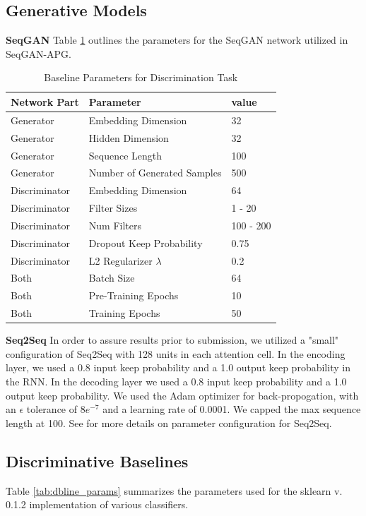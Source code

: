 \documentclass[sigconf]{acmart}
\begin{document}
\subsection{Generative Models}

\textbf{SeqGAN}
Table \ref{tab:seqgan_params} outlines the parameters for the SeqGAN network utilized in SeqGAN-APG. 
\begin{table}[ht]
	\begin{tabular}{|l|l|l|}
    \hline\textbf{Network Part} & \textbf{Parameter} & \textbf{value}\\\hline
	Generator & Embedding Dimension & 32 \\
    Generator & Hidden Dimension & 32 \\
    Generator & Sequence Length & 100 \\
    Generator & Number of Generated Samples & 500\\
	Discriminator & Embedding Dimension & 64 \\
    Discriminator & Filter Sizes & 1 - 20 \\
    Discriminator & Num Filters & 100 - 200 \\
    Discriminator & Dropout Keep Probability & 0.75 \\
    Discriminator & L2 Regularizer $\lambda$ & 0.2 \\
    Both & Batch Size & 64\\
    Both & Pre-Training Epochs & 10 \\
    Both & Training Epochs & 50 \\
	\end{tabular}
    \caption{Baseline Parameters for Discrimination Task}
	\label{tab:seqgan_params}
\end{table}

\textbf{Seq2Seq} 
In order to assure results prior to submission, we utilized a "small" configuration of Seq2Seq with 128 units in each attention cell. In the encoding layer, we used a 0.8 input keep probability and a 1.0 output keep probability in the RNN. In the decoding layer we used a 0.8 input keep probability and a 1.0 output keep probability. We used the Adam optimizer for back-propogation, with an $\epsilon$ tolerance of $8e^{-7}$ and a learning rate of 0.0001. We capped the max sequence length at 100. See \cite{luong2015seq2seq} for more details on parameter configuration for Seq2Seq.

\subsection{Discriminative Baselines}
Table \ref{tab:dbline_params} summarizes the parameters used for the sklearn v. 0.1.2 implementation of various classifiers. 
\end{document}
